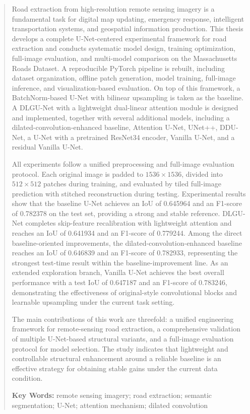 \documentclass[12pt,a4paper]{ctexart}
\begin{document}
\newpage
\begin{abstract}
Road extraction from high-resolution remote sensing imagery is a fundamental task for digital map updating, emergency response, intelligent transportation systems, and geospatial information production. This thesis develops a complete U-Net-centered experimental framework for road extraction and conducts systematic model design, training optimization, full-image evaluation, and multi-model comparison on the Massachusetts Roads Dataset. A reproducible PyTorch pipeline is rebuilt, including dataset organization, offline patch generation, model training, full-image inference, and visualization-based evaluation. On top of this framework, a BatchNorm-based U-Net with bilinear upsampling is taken as the baseline. A DLGU-Net with a lightweight dual-linear attention module is designed and implemented, together with several additional models, including a dilated-convolution-enhanced baseline, Attention U-Net, UNet++, DDU-Net, a U-Net with a pretrained ResNet34 encoder, Vanilla U-Net, and a residual Vanilla U-Net.

All experiments follow a unified preprocessing and full-image evaluation protocol. Each original image is padded to $1536 \times 1536$, divided into $512 \times 512$ patches during training, and evaluated by tiled full-image prediction with stitched reconstruction during testing. Experimental results show that the baseline U-Net achieves an IoU of 0.645964 and an F1-score of 0.782378 on the test set, providing a strong and stable reference. DLGU-Net completes skip-feature recalibration with lightweight attention and reaches an IoU of 0.641934 and an F1-score of 0.779244. Among the direct baseline-oriented improvements, the dilated-convolution-enhanced baseline reaches an IoU of 0.646839 and an F1-score of 0.782933, representing the strongest test-time result within the baseline-improvement line. As an extended exploration branch, Vanilla U-Net achieves the best overall performance with a test IoU of 0.647187 and an F1-score of 0.783246, demonstrating the effectiveness of original-style convolutional blocks and learnable upsampling under the current task setting.

The main contributions of this work are threefold: a unified engineering framework for remote-sensing road extraction, a comprehensive validation of multiple U-Net-based structural variants, and a full-image evaluation protocol for model selection. The study indicates that lightweight and controllable structural enhancement around a reliable baseline is an effective strategy for obtaining stable gains under the current data condition.

\noindent\textbf{Key Words:} remote sensing imagery; road extraction; semantic segmentation; U-Net; attention mechanism; dilated convolution
\end{abstract}
\end{document}
